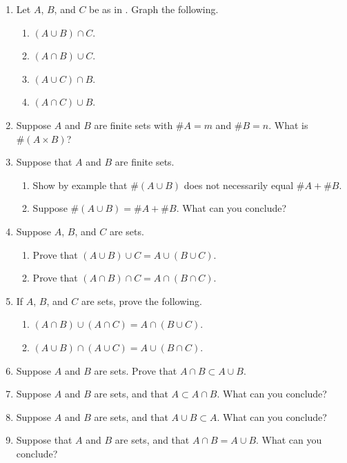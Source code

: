 \begin{enumerate}
  \item Let $A$, $B$, and $C$ be as in . Graph the following.
\begin{enumerate}
    \item $(A \cup B) \cap C$.
    \item $(A \cap B) \cup C$.
    \item $(A \cup C) \cap B$.
    \item $(A \cap C) \cup B$.
\end{enumerate}

  \item Suppose $A$ and $B$ are finite sets with $\# A = m$ and $\# B = n$. What is $\# (A \times B)$?

  \item Suppose that $A$ and $B$ are finite sets.
\begin{enumerate}
    \item Show by example that $\# (A \cup B)$ does not necessarily equal $\# A + \# B$.
    \item Suppose $\# (A \cup B) = \# A + \# B$. What can you conclude?
\end{enumerate}

  \item Suppose $A$, $B$, and $C$ are sets.
\begin{enumerate}
    \item Prove that $(A \cup B) \cup C = A \cup (B \cup C)$.
    \item Prove that $(A \cap B) \cap C = A \cap (B \cap C)$.
\end{enumerate}

  \item If $A$, $B$, and $C$ are sets, prove the following.
\begin{enumerate}
    \item $(A \cap B) \cup (A \cap C) = A \cap (B \cup C)$.
    \item $(A \cup B) \cap (A \cup C) = A \cup (B \cap C)$.
\end{enumerate}


  \item Suppose $A$ and $B$ are sets. Prove that $A \cap B \subset A \cup B$.

  \item Suppose $A$ and $B$ are sets, and that $A \subset A \cap B$. What can you conclude?

  \item Suppose $A$ and $B$ are sets, and that $A \cup B \subset A$. What can you conclude?

  \item Suppose that $A$ and $B$ are sets, and that $A \cap B = A \cup B$. What can you conclude?

\end{enumerate}
